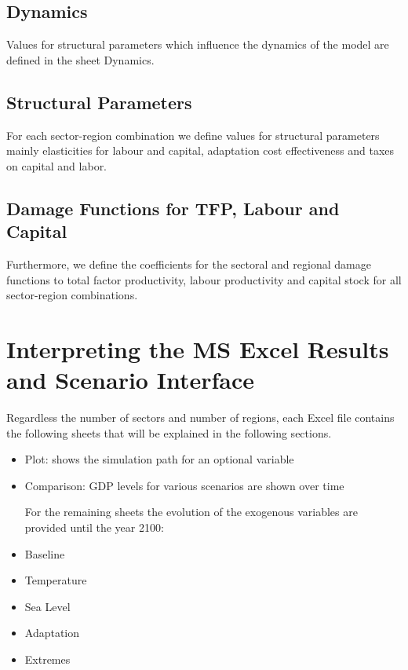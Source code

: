\documentclass[10pt,a4paper]{article}
\begin{document}
    
\subsection{Dynamics}
Values for structural parameters which influence the dynamics of the model are defined in the sheet Dynamics.
 
 \subsection{Structural Parameters}
For each sector-region combination we define values for structural parameters mainly elasticities for labour and capital, adaptation cost effectiveness and taxes on capital and labor.
 
 \subsection{Damage Functions for TFP, Labour and Capital}
 
 Furthermore, we define the coefficients for the sectoral and regional damage functions to total factor productivity, labour productivity and capital stock for all sector-region combinations.

\newpage
\section{Interpreting the MS Excel Results and Scenario Interface}

Regardless the number of sectors and number of regions, each Excel file contains the following sheets that will be explained in the following sections.
\begin{itemize}\setlength{\itemsep}{0pt}
	
	\item Plot: shows the simulation path for an optional variable

	\item Comparison: GDP levels for various scenarios are shown over time 
	
	\vspace{0.5cm}
	For the remaining sheets the evolution of the exogenous variables are provided until the year 2100:
	\item Baseline
	\item Temperature
	\item Sea Level
	\item Adaptation
	\item Extremes

\end{itemize}
\end{document}
